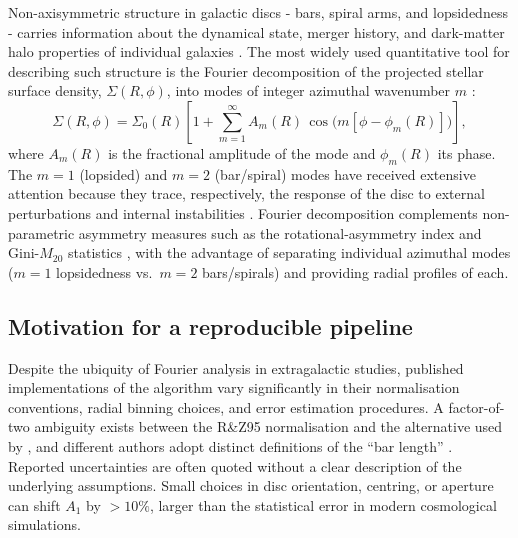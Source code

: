 \documentclass[fleqn,usenatbib]{mnras}
\newcommand{\Am}[1]{A_{#1}}
\newcommand{\Amone}{\ensuremath{\Am{1}}}
\begin{document}
Non-axisymmetric structure in galactic discs - bars, spiral arms,
and lopsidedness - carries information about the dynamical state,
merger history, and dark-matter halo properties of individual
galaxies \citep{2008gady.book.....B,1993RPPh...56..173S}.  The
most widely used quantitative tool for describing such structure is
the Fourier decomposition of the projected stellar surface density,
$\Sigma(R,\phi)$, into modes of integer azimuthal wavenumber $m$
\citep[R\&Z95 hereafter]{1995ApJ...447...82R}:
\begin{equation}
  \Sigma(R,\phi) = \Sigma_0(R) \left[ 1 +
      \sum_{m=1}^{\infty} \Am{m}(R)\,\cos\!\bigl(m[\phi - \phi_m(R)]\bigr)
  \right],
  \label{eq:fourier}
\end{equation}
where $\Am{m}(R)$ is the fractional amplitude of the mode and
$\phi_m(R)$ its phase.  The $m=1$ (lopsided) and $m=2$ (bar/spiral)
modes have received extensive attention because they trace,
respectively, the response of the disc to external perturbations
\citep{2002A&A...391..471J,2005A&A...438..507B} and internal instabilities
\citep{2003MNRAS.341.1179A,2007MNRAS.382..419S}.  Fourier decomposition
complements non-parametric asymmetry measures such as the
rotational-asymmetry index \citep{1996ApJS..107....1A,2003ApJS..147....1C}
and Gini-$M_{20}$ statistics \citep{2004AJ....128..163L}, with the
advantage of separating individual azimuthal modes ($m = 1$
lopsidedness vs.\ $m = 2$ bars/spirals) and providing radial
profiles of each.

\subsection{Motivation for a reproducible pipeline}

Despite the ubiquity of Fourier analysis in extragalactic studies,
published implementations of the algorithm vary significantly in
their normalisation conventions, radial binning choices, and error
estimation procedures.  A factor-of-two ambiguity exists between the
R\&Z95 normalisation and the alternative used by
\citet{2007MNRAS.382..419S}, and different authors adopt distinct definitions
of the ``bar length'' \citep[cf.][]{2003MNRAS.341.1179A,2005A&A...434..109A,
2009A&A...495..491A}.  Reported uncertainties are often quoted without a
clear description of the underlying assumptions.  Small choices in
disc orientation, centring, or aperture can shift $\Amone$ by
$>10\%$, larger than the statistical error in modern cosmological
simulations.
\end{document}
